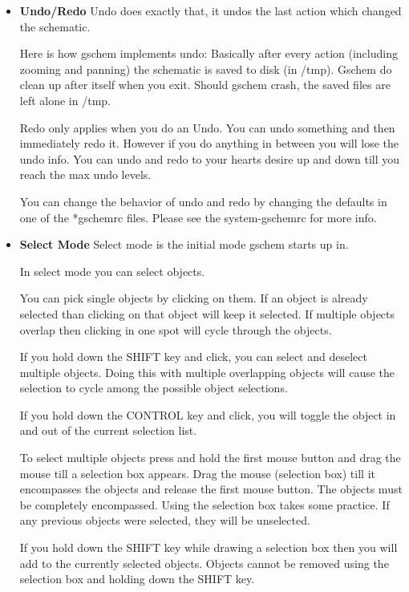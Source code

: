 \documentclass{article}
\begin{document}
\begin{itemize}
\item {\bf Undo/Redo} Undo does exactly that, it undos the last action
  which changed the schematic.
  
  Here is how gschem implements undo: Basically after every action
  (including zooming and panning) the schematic is saved to disk (in
  /tmp).  Gschem do clean up after itself when you exit.  Should
  gschem crash, the saved files are left alone in /tmp.
  
  Redo only applies when you do an Undo.  You can undo something and
  then immediately redo it.  However if you do anything in between you
  will lose the undo info.  You can undo and redo to your hearts
  desire up and down till you reach the max undo levels.
  
  You can change the behavior of undo and redo by changing the
  defaults in one of the *gschemrc files.  Please see the
  system-gschemrc for more info.
  
\item {\bf Select Mode} Select mode is the initial mode gschem starts
  up in.
  
  In select mode you can select objects.
  
  You can pick single objects by clicking on them.  If an object is
  already selected than clicking on that object will keep it selected.
  If multiple objects overlap then clicking in one spot will cycle
  through the objects.
  
  If you hold down the SHIFT key and click, you can select and
  deselect multiple objects.  Doing this with multiple overlapping
  objects will cause the selection to cycle among the possible object
  selections.
  
  If you hold down the CONTROL key and click, you will toggle the
  object in and out of the current selection list.
  
  To select multiple objects press and hold the first mouse button and
  drag the mouse till a selection box appears.  Drag the mouse
  (selection box) till it encompasses the objects and release the
  first mouse button.  The objects must be completely encompassed.
  Using the selection box takes some practice.  If any previous
  objects were selected, they will be unselected.
  
  If you hold down the SHIFT key while drawing a selection box then
  you will add to the currently selected objects.  Objects cannot be
  removed using the selection box and holding down the SHIFT key.
  

\end{itemize}
\end{document}
